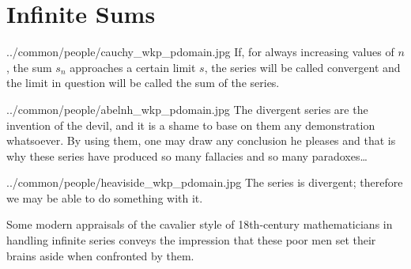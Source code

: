 ﻿%
\chapter{Infinite Sums}
  {../common/people/cauchy_wkp_pdomain.jpg}
  {If, for always increasing values of $n$, the sum $s_n$ approaches a certain limit $s$,
   the series will be called convergent and the limit in question will be called the 
   sum of the series.}

  {../common/people/abelnh_wkp_pdomain.jpg}
  {The divergent series are the invention of the devil, and it is a shame to base on them any demonstration whatsoever.
   By using them, one may draw any conclusion he pleases and that is why these series have produced so many 
   fallacies and so many paradoxes\ldots}

{../common/people/heaviside_wkp_pdomain.jpg}
{The series is divergent; therefore we may be able to do something with it.}

{Some modern appraisals of the cavalier style of 18th-century mathematicians in handling 
infinite series conveys the impression that these poor men set their brains aside when 
confronted by them.}

